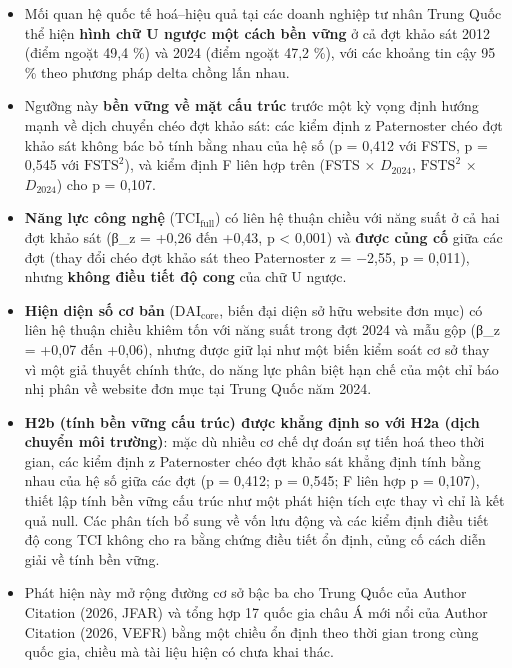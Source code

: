 \documentclass[12pt,a4paper]{article}
\begin{document}
\begin{itemize}
\item
  Mối quan hệ quốc tế hoá--hiệu quả tại các doanh nghiệp tư nhân Trung
  Quốc thể hiện \textbf{hình chữ U ngược một cách bền vững} ở cả đợt
  khảo sát 2012 (điểm ngoặt 49,4 \%) và 2024 (điểm ngoặt 47,2 \%), với
  các khoảng tin cậy 95 \% theo phương pháp delta chồng lấn nhau.
\item
  Ngưỡng này \textbf{bền vững về mặt cấu trúc} trước một kỳ vọng định
  hướng mạnh về dịch chuyển chéo đợt khảo sát: các kiểm định z
  Paternoster chéo đợt khảo sát không bác bỏ tính bằng nhau của hệ số (p
  = 0,412 với FSTS, p = 0,545 với \(\mathrm{FSTS}^2\)), và kiểm định F
  liên hợp trên (FSTS × \(D_{2024}\), \(\mathrm{FSTS}^2\) ×
  \(D_{2024}\)) cho p = 0,107.
\item
  \textbf{Năng lực công nghệ} (\(\mathrm{TCI}_{\text{full}}\)) có liên
  hệ thuận chiều với năng suất ở cả hai đợt khảo sát (β\_z = +0,26 đến
  +0,43, p \textless{} 0,001) và \textbf{được củng cố} giữa các đợt
  (thay đổi chéo đợt khảo sát theo Paternoster z = −2,55, p = 0,011),
  nhưng \textbf{không điều tiết độ cong} của chữ U ngược.
\item
  \textbf{Hiện diện số cơ bản} (\(\mathrm{DAI}_{\text{core}}\), biến đại
  diện sở hữu website đơn mục) có liên hệ thuận chiều khiêm tốn với năng
  suất trong đợt 2024 và mẫu gộp (β\_z = +0,07 đến +0,06), nhưng được
  giữ lại như một biến kiểm soát cơ sở thay vì một giả thuyết chính
  thức, do năng lực phân biệt hạn chế của một chỉ báo nhị phân về
  website đơn mục tại Trung Quốc năm 2024.
\item
  \textbf{H2b (tính bền vững cấu trúc) được khẳng định so với H2a (dịch
  chuyển môi trường)}: mặc dù nhiều cơ chế dự đoán sự tiến hoá theo thời
  gian, các kiểm định z Paternoster chéo đợt khảo sát khẳng định tính
  bằng nhau của hệ số giữa các đợt (p = 0,412; p = 0,545; F liên hợp p =
  0,107), thiết lập tính bền vững cấu trúc như một phát hiện tích cực
  thay vì chỉ là kết quả null. Các phân tích bổ sung về vốn lưu động và
  các kiểm định điều tiết độ cong TCI không cho ra bằng chứng điều tiết
  ổn định, củng cố cách diễn giải về tính bền vững.
\item
  Phát hiện này mở rộng đường cơ sở bậc ba cho Trung Quốc của Author
  Citation (2026, JFAR) và tổng hợp 17 quốc gia châu Á mới nổi của
  Author Citation (2026, VEFR) bằng một chiều ổn định theo thời gian
  trong cùng quốc gia, chiều mà tài liệu hiện có chưa khai thác.
\end{itemize}
\end{document}
